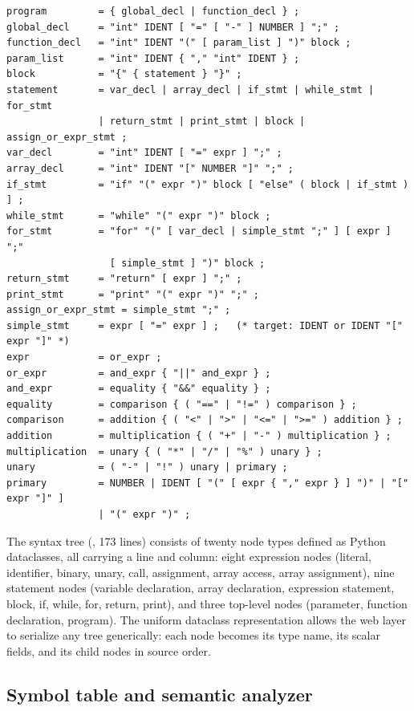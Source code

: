 \begin{lstlisting}[basicstyle=\ttfamily\scriptsize, numbers=none, caption={EBNF grammar of the C subset implemented by the parser. Terminals are quoted or in upper case; braces denote repetition and square brackets optional parts.}, label={lst:grammar}]
program         = { global_decl | function_decl } ;
global_decl     = "int" IDENT [ "=" [ "-" ] NUMBER ] ";" ;
function_decl   = "int" IDENT "(" [ param_list ] ")" block ;
param_list      = "int" IDENT { "," "int" IDENT } ;
block           = "{" { statement } "}" ;
statement       = var_decl | array_decl | if_stmt | while_stmt | for_stmt
                | return_stmt | print_stmt | block | assign_or_expr_stmt ;
var_decl        = "int" IDENT [ "=" expr ] ";" ;
array_decl      = "int" IDENT "[" NUMBER "]" ";" ;
if_stmt         = "if" "(" expr ")" block [ "else" ( block | if_stmt ) ] ;
while_stmt      = "while" "(" expr ")" block ;
for_stmt        = "for" "(" [ var_decl | simple_stmt ";" ] [ expr ] ";"
                  [ simple_stmt ] ")" block ;
return_stmt     = "return" [ expr ] ";" ;
print_stmt      = "print" "(" expr ")" ";" ;
assign_or_expr_stmt = simple_stmt ";" ;
simple_stmt     = expr [ "=" expr ] ;   (* target: IDENT or IDENT "[" expr "]" *)
expr            = or_expr ;
or_expr         = and_expr { "||" and_expr } ;
and_expr        = equality { "&&" equality } ;
equality        = comparison { ( "==" | "!=" ) comparison } ;
comparison      = addition { ( "<" | ">" | "<=" | ">=" ) addition } ;
addition        = multiplication { ( "+" | "-" ) multiplication } ;
multiplication  = unary { ( "*" | "/" | "%" ) unary } ;
unary           = ( "-" | "!" ) unary | primary ;
primary         = NUMBER | IDENT [ "(" [ expr { "," expr } ] ")" | "[" expr "]" ]
                | "(" expr ")" ;
\end{lstlisting}

The syntax tree (, 173 lines) consists of twenty node types defined as Python dataclasses, all carrying a line and column: eight expression nodes (literal, identifier, binary, unary, call, assignment, array access, array assignment), nine statement nodes (variable declaration, array declaration, expression statement, block, if, while, for, return, print), and three top-level nodes (parameter, function declaration, program). The uniform dataclass representation allows the web layer to serialize any tree generically: each node becomes its type name, its scalar fields, and its child nodes in source order.

\subsection{Symbol table and semantic analyzer}

